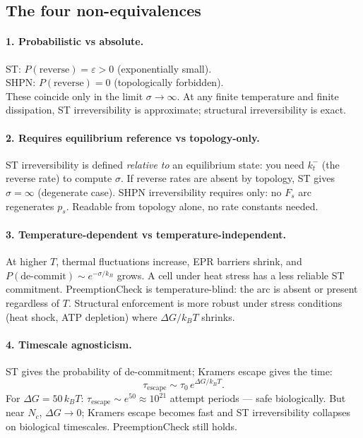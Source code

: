 \documentclass[11pt,a4paper]{article}
\begin{document}
\subsection*{The four non-equivalences}

\paragraph{1. Probabilistic vs absolute.}
ST: $P(\text{reverse}) = \varepsilon > 0$ (exponentially small). \\
SHPN: $P(\text{reverse}) = 0$ (topologically forbidden). \\
These coincide only in the limit $\sigma \to \infty$.  At any finite
temperature and finite dissipation, ST irreversibility is approximate;
structural irreversibility is exact.

\paragraph{2. Requires equilibrium reference vs topology-only.}
ST irreversibility is defined \emph{relative to} an equilibrium state:
you need $k_t^-$ (the reverse rate) to compute $\sigma$.  If reverse rates
are absent by topology, ST gives $\sigma = \infty$ (degenerate case).
SHPN irreversibility requires only: no $F_s$ arc regenerates $p_s$.
Readable from topology alone, no rate constants needed.

\paragraph{3. Temperature-dependent vs temperature-independent.}
At higher $T$, thermal fluctuations increase, EPR barriers shrink, and
$P(\text{de-commit}) \sim e^{-\sigma/k_B}$ grows.
A cell under heat stress has a less reliable ST commitment.
PreemptionCheck is temperature-blind: the arc is absent or present
regardless of $T$.  Structural enforcement is more robust under
stress conditions (heat shock, ATP depletion) where $\Delta G / k_BT$ shrinks.

\paragraph{4. Timescale agnosticism.}
ST gives the probability of de-commitment; Kramers escape gives the time:
\[
  \tau_{\text{escape}} \sim \tau_0 \, e^{\Delta G / k_BT}.
\]
For $\Delta G = 50\,k_BT$: $\tau_{\text{escape}} \sim e^{50} \approx 10^{21}$
attempt periods --- safe biologically.  But near $N_c$, $\Delta G \to 0$;
Kramers escape becomes fast and ST irreversibility collapses on biological
timescales.  PreemptionCheck still holds.
\end{document}
